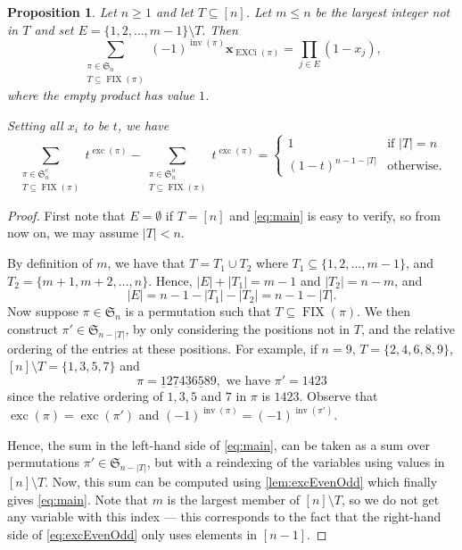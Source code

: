\documentclass[reqno]{amsart}
\newtheorem{proposition}[theorem]{Proposition}
\theoremstyle{definition}
\newcommand{\xvec}{\mathbf{x}}
\newcommand{\symS}{\mathfrak{S}}
\DeclareMathOperator{\inv}{inv}
\DeclareMathOperator{\FIX}{FIX}
\DeclareMathOperator{\exc}{exc}
\DeclareMathOperator{\EXCi}{EXCi}
\begin{document}
\begin{proposition}\label{prop:main}
Let $n\geq 1$ and let $T \subseteq [n]$. 
Let $m \leq n$ be the largest integer not in $T$ and set
$
  E = \{1,2,\dotsc,m-1\} \setminus T.
$
Then
 \begin{equation}\label{eq:main}
 \sum_{\substack{\pi \in \symS_n  \\ T \subseteq \FIX(\pi)  }} 
 (-1)^{\inv(\pi)} \xvec_{\EXCi(\pi)} =  
 \prod_{j \in E} (1-x_j),
\end{equation}
where the empty product has value $1$.

Setting all $x_i$ to be $t$, we have
\begin{equation}
 \sum_{\substack{\pi \in \symS^e_n  \\ T \subseteq \FIX(\pi)  }} t^{\exc(\pi)}
 -
 \sum_{\substack{\pi \in \symS^o_n \\ T \subseteq \FIX(\pi)   }} t^{\exc(\pi)}
 = 
 \begin{cases}
 1 & \text{if $|T|=n$} \\
 (1-t)^{n-1-|T|} & \text{otherwise.}
 \end{cases}
\end{equation}
\end{proposition}
\begin{proof}
First note that $E = \emptyset$ if $T=[n]$ and \eqref{eq:main} is easy to verify,
so from now on, we may assume $|T| < n$.

By definition of $m$, we have that $T = T_1 \cup T_2$
where $T_1 \subseteq \{1,2,\dotsc,m-1\}$, and $T_2 = \{m+1,m+2,\dotsc,n\}$.
Hence, $|E|+|T_1| = m-1$ and $|T_2| = n-m$, and 
\[
|E| = n-1-|T_1|-|T_2| = n-1-|T|.
\]
Now suppose $\pi \in \symS_n$ is a permutation such that $T \subseteq \FIX(\pi)$.
We then construct $\pi' \in \symS_{n-|T|}$, by only considering the positions not in $T$,
and the relative ordering of the entries at these positions.
For example, if $n=9$, $T=\{2,4,6,8,9\}$,
$[n] \setminus T = \{1,3,5,7\}$ and
\[
  \pi = \underline{1} 2 \underline{7} 4 \underline{3} 6 \underline{5} 8 9,
  \text{ we have } \pi' = 1423
\]
since the relative ordering of $1,3,5$ and $7$ in $\pi$ is $1423$.
Observe that $\exc(\pi) = \exc(\pi')$ and $(-1)^{\inv(\pi)} = (-1)^{\inv(\pi')}$.

Hence, the sum in the left-hand side of \eqref{eq:main},
can be taken as a sum over permutations $\pi' \in \symS_{n-|T|}$,
but with a reindexing of the variables using values in $[n] \setminus T$.
Now, this sum can be computed using \cref{lem:excEvenOdd}
which finally gives \eqref{eq:main}.
Note that $m$ is the largest member of $[n] \setminus T$, 
so we do not get any variable with this index --- this corresponds
to the fact that the right-hand side of \eqref{eq:excEvenOdd}
only uses elements in $[n-1]$.
\end{proof}
\end{document}
